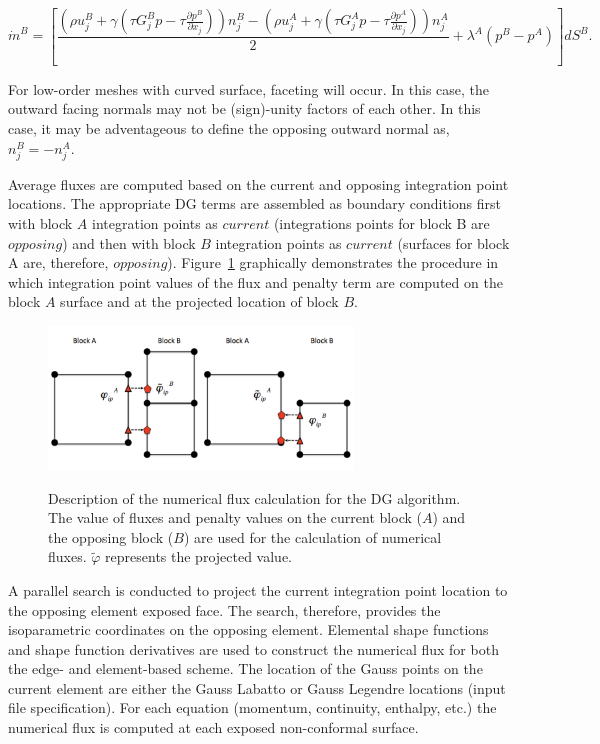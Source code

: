 \begin{equation} 
        \dot {m}^B = [\frac{(\rho u_j^B + \gamma(\tau G_j^B p -\tau \frac{\partial p^B}{\partial x_j}))n_j^B
        				       - (\rho u_j^A + \gamma(\tau G_j^A p -\tau \frac{\partial p^A}{\partial x_j}))n_j^A}{2}
				       + \lambda^A ( p^B - p^A)] dS^B.
\label{mdotB}
\end{equation}

For low-order meshes with curved surface, faceting will occur. In this case, the outward facing normals may 
not be (sign)-unity factors of each other. In this case, it may be adventageous to define the opposing 
outward normal as, $n_j^B = -n_j^A$. 

Average fluxes are computed based on the current and opposing integration point locations. The 
appropriate DG terms are assembled as boundary conditions first with block $A$ integration 
points as $current$ (integrations points for block B are $opposing$) and then with block $B$ 
integration points as $current$ (surfaces for block A are, therefore, $opposing$). Figure~\ref{nonConformal} 
graphically demonstrates the procedure in which integration point values of the flux and penalty 
term are computed on the block $A$ surface and at the projected location of block $B$. 

\begin{figure}
\centering
  {\includegraphics[height=1.5in]{images/contactSearchAndEval.pdf}}
  \vspace{0.25in}
  \caption{Description of the numerical flux calculation for the DG algorithm. The 
    value of fluxes and penalty values on the current block ($A$) and the opposing block ($B$) are used 
    for the calculation of numerical fluxes. $\tilde \varphi$ represents the projected value.}
  \label{nonConformal}
\end{figure}

A parallel search is conducted to project the current integration point location to the opposing element exposed face. 
The search, therefore, provides the isoparametric coordinates on the opposing element. Elemental shape functions 
and shape function derivatives are used to construct the numerical flux for both the edge- and element-based 
scheme. The location of the Gauss points on the current element are either the Gauss Labatto or Gauss Legendre 
locations (input file specification). For each equation (momentum, continuity, enthalpy, etc.) the numerical 
flux is computed at each exposed non-conformal surface.

